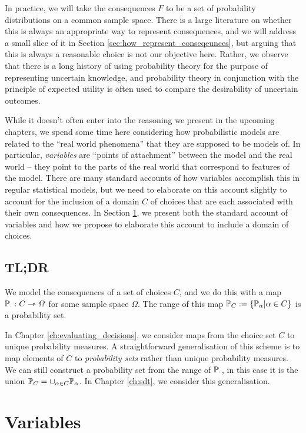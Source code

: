 In practice, we will take the consequences $F$ to be a set of probability distributions on a common sample space. There is a large literature on whether this is always an appropriate way to represent consequences, and we will address a small slice of it in Section \ref{sec:how_represent_conseqeunces}, but arguing that this is always a reasonable choice is not our objective here. Rather, we observe that there is a long history of using probability theory for the purpose of representing uncertain knowledge, and probability theory in conjunction with the principle of expected utility is often used to compare the desirability of uncertain outcomes.

While it doesn't often enter into the reasoning we present in the upcoming chapters, we spend some time here considering how probabilistic models are related to the ``real world phenomena'' that they are supposed to be models of. In particular, \emph{variables} are ``points of attachment'' between the model and the real world -- they point to the parts of the real world that correspond to features of the model. There are many standard accounts of how variables accomplish this in regular statistical models, but we need to elaborate on this account slightly to account for the inclusion of a domain $C$ of choices that are each associated with their own consequences. In Section \ref{sec:variable}, we present both the standard account of variables and how we propose to elaborate this account to include a domain of choices.

\subsection{TL;DR}

We model the consequences of a set of choices $C$, and we do this with a map $\mathbb{P}_\cdot:C\rightarrowtriangle \Omega$ for some sample space $\Omega$. The range of this map $\mathbb{P}_C:=\{\mathbb{P}_\alpha|\alpha\in C\}$ is a probability set.

In Chapter \ref{ch:evaluating_decisions}, we consider maps from the choice set $C$ to unique probability measures. A straightforward generalisation of this scheme is to map elements of $C$ to \emph{probability sets} rather than unique probability measures. We can still construct a probability set from the range of $\mathbb{P}_\cdot$, in this case it is the union $\mathbb{P}_C=\cup_{\alpha\in C} \mathbb{P}_\alpha$. In Chapter \ref{ch:sdt}, we consider this generalisation.


\section{Variables}\label{sec:variable}

